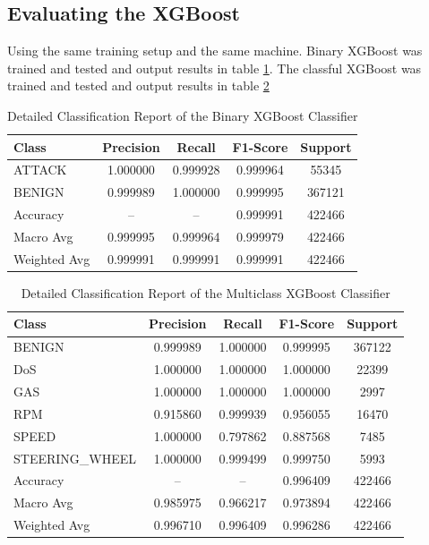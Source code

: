 \documentclass[conference]{IEEEtran}
\begin{document}
\subsection{Evaluating the XGBoost}
Using the same training setup and the same machine. Binary XGBoost was trained and tested and output results in table \ref{tab:binary_classification_report_XGB}. The classful XGBoost was trained and tested and output results in table \ref{tab:multiclass_classification_report_XGB}

\begin{table}[htbp]
\centering
\caption{Detailed Classification Report of the Binary XGBoost Classifier}
\label{tab:binary_classification_report_XGB}
\begin{tabular}{lcccc}
\hline
Class & Precision & Recall & F1-Score & Support \\
\hline
ATTACK & 1.000000 & 0.999928 & 0.999964 & 55345 \\
BENIGN & 0.999989 & 1.000000 & 0.999995 & 367121 \\
\hline
Accuracy     & --       & --       & 0.999991 & 422466 \\
Macro Avg    & 0.999995 & 0.999964 & 0.999979 & 422466 \\
Weighted Avg & 0.999991 & 0.999991 & 0.999991 & 422466 \\
\hline
\end{tabular}
\end{table}

\begin{table}[htbp]
\centering
\caption{Detailed Classification Report of the Multiclass XGBoost Classifier}
\label{tab:multiclass_classification_report_XGB}
\begin{tabular}{lcccc}
\toprule
Class & Precision & Recall & F1-Score & Support \\
\midrule
BENIGN          & 0.999989 & 1.000000 & 0.999995 & 367122 \\
DoS             & 1.000000 & 1.000000 & 1.000000 & 22399 \\
GAS             & 1.000000 & 1.000000 & 1.000000 & 2997 \\
RPM             & 0.915860 & 0.999939 & 0.956055 & 16470 \\
SPEED           & 1.000000 & 0.797862 & 0.887568 & 7485 \\
STEERING\_WHEEL & 1.000000 & 0.999499 & 0.999750 & 5993 \\
\midrule
Accuracy     & --       & --       & 0.996409 & 422466 \\
Macro Avg    & 0.985975 & 0.966217 & 0.973894 & 422466 \\
Weighted Avg & 0.996710 & 0.996409 & 0.996286 & 422466 \\
\bottomrule
\end{tabular}
\end{table}
\end{document}
